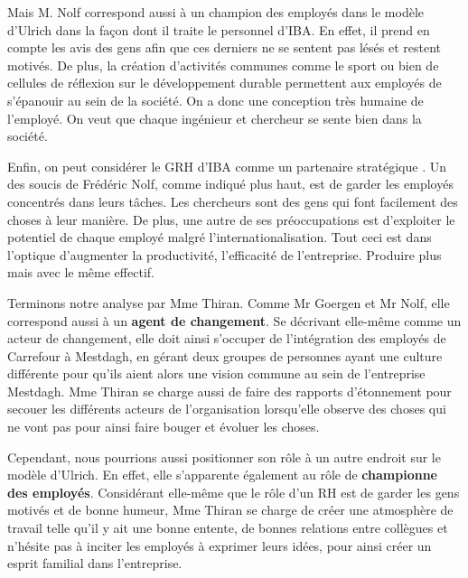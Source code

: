 
Mais M. Nolf correspond aussi à un \og champion des employés \fg{} dans le modèle d'Ulrich dans la façon dont il traite le personnel d'IBA. En effet, il prend en compte les avis des gens afin que ces derniers ne se sentent pas lésés et restent motivés. De plus, la création d'activités communes comme le sport ou bien de cellules de réflexion sur le développement durable permettent aux employés de s'épanouir au sein de la société. On a donc une conception très humaine de l'employé. On veut que chaque ingénieur et chercheur se sente bien dans la société. \newline

Enfin, on peut considérer le GRH d'IBA comme un \og partenaire stratégique \fg{}. Un des soucis de Frédéric Nolf, comme indiqué plus haut, est de garder les employés concentrés dans leurs tâches. Les chercheurs sont des gens qui font facilement des choses à leur manière. De plus, une autre de ses préoccupations est d'exploiter le potentiel de chaque employé malgré l'internationalisation. Tout ceci est dans l'optique d'augmenter la productivité, l'efficacité de l'entreprise. Produire plus mais avec le même effectif.


Terminons notre analyse par Mme Thiran. Comme Mr Goergen et Mr Nolf, elle correspond aussi à un \textbf{agent de changement}. Se décrivant elle-même comme un acteur de changement, elle doit ainsi s’occuper de l’intégration des employés de Carrefour à Mestdagh, en gérant deux groupes de personnes ayant une culture différente pour qu’ils aient alors une vision commune au sein de l'entreprise Mestdagh. Mme Thiran se charge aussi de faire des rapports d’étonnement pour secouer les différents acteurs de l’organisation lorsqu’elle observe des choses qui ne vont pas pour ainsi faire bouger et évoluer les choses.\newline

Cependant, nous pourrions aussi positionner son rôle à un autre endroit sur le modèle d’Ulrich. En effet, elle s’apparente également au rôle de \textbf{championne des employés}. Considérant elle-même que le rôle d’un RH est de garder les gens motivés et de bonne humeur, Mme Thiran se charge de créer une atmosphère de travail telle qu’il y ait une bonne entente, de bonnes relations entre collègues et n’hésite pas à inciter les employés à exprimer leurs idées, pour ainsi créer un esprit familial dans l’entreprise. 


